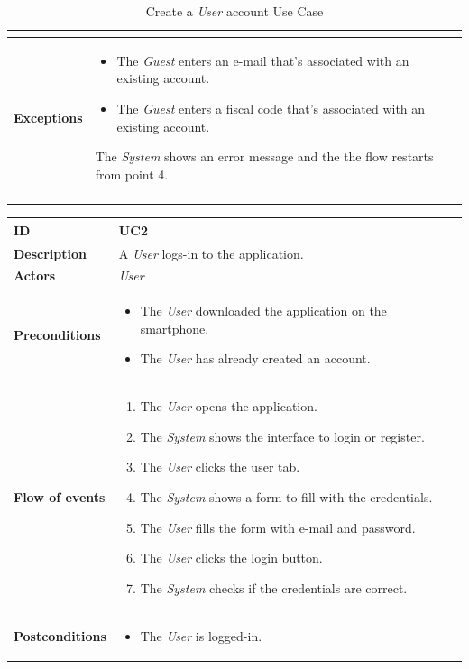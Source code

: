 \documentclass {article}
\begin{document}
\begin{longtable}{| p{3 cm} | p{10.5 cm} |}
\begin{itemize}
			\end{itemize}
			\\
			\hline
			{\bf Exceptions} & 	
			\begin{itemize}
				\item The {\it Guest} enters an e-mail that's associated with an existing account.
				\item The {\it Guest} enters a fiscal code that's associated with an existing account. 
			\end{itemize}
			The {\it System} shows an error message and the the flow restarts from point 4.
			\\
			\hline
			\caption{Create a {\it User} account Use Case}
			\end{longtable}

	\begin{longtable}{| p{3 cm} | p{10.5 cm} |} 
			\hline
			{\bf ID} & UC2 \\
			\hline
			{\bf Description} & A {\it User} logs-in to the application.\\
			\hline
			{\bf Actors} & {\it User}\\
			\hline
			{\bf Preconditions} & 	
			\begin{itemize}
				\item The {\it User} downloaded the application on the smartphone.
				\item The {\it User} has already created an account.
			\end{itemize}
			\\
			\hline
			{\bf Flow of events} &	
			\begin{enumerate}
				\item The {\it User} opens the application.
				\item The {\it System} shows the interface to login or register.
				\item The {\it User} clicks the user tab.
				\item The {\it System} shows a form to fill with the credentials.
				\item The {\it User} fills the form with e-mail and password. 
				\item The {\it User} clicks the login button.
				\item The {\it System} checks if the credentials are correct. 
			\end{enumerate}
			\\
			\hline
			{\bf Postconditions} & 
			\begin{itemize}
				\item The {\it User} is logged-in.

\end{itemize}
\end{longtable}
\end{document}
